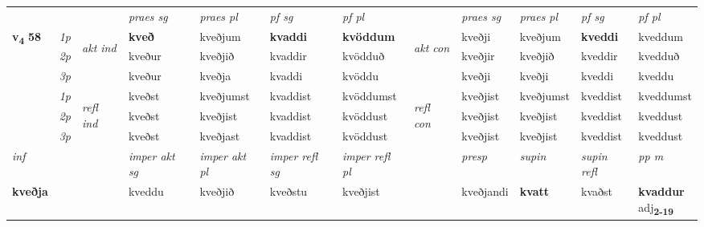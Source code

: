 \begin{longtable}[l]{X>{\footnotesize\itshape}llXXXXlXXXX}
\midrule

 & &   & \textit{praes sg}  & \textit{praes pl}    & \textit{ pf sg} & \textit{pf pl} & & \textit{praes sg}  & \textit{praes pl}    & \textit{pf sg} & \textit{pf pl }  \\ \cmidrule{4-7} \cmidrule{9-12}
 \multirow{2}{*}{{{\textbf{v{\textsubscript{4}}} \Large{\textbf{58}}}}}  & 1p & \multirow{3}{*}{\begin{turn}{90}\textit{akt ind}\end{turn}} & \textbf{kveð} & kveðjum & \textbf{kvaddi} & \textbf{kvöddum} & \multirow{3}{*}{\begin{turn}{90}\textit{akt con}\end{turn}} &kveðji & kveðjum & \textbf{kveddi} & kveddum\\*
 & 2p &  &  kveður  & kveðjið & kvaddir & kvödduð & & kveðjir & kveðjið & kveddir & kvedduð \\*
 & 3p &  & kveður & kveðja & kvaddi & kvöddu & & kveðji & kveðji& kveddi & kveddu \\*
\cmidrule{4-7} \cmidrule{9-12}
 & 1p & \multirow{3}{*}{\begin{turn}{90}\textit{refl ind}\end{turn}}  & kveðst & kveðjumst & kvaddist & kvöddumst & \multirow{3}{*}{\begin{turn}{90}\textit{refl con}\end{turn}}  &kveðjist & kveðjumst & kveddist & kveddumst \\*
 & 2p &  & kveðst & kveðjist & kvaddist & kvöddust & &kveðjist & kveðjist & kveddist & kveddust \\*
 & 3p  & & kveðst & kveðjast & kvaddist & kvöddust & & kveðjist & kveðjist& kveddist & kveddust \\*
\cmidrule{4-7} \cmidrule{9-12}

   {\textit{inf}} & &  & \textit{imper akt sg} & \textit{imper akt pl} & \textit{imper refl sg} & \textit{imper refl pl} && \textit{presp} & \textit{supin} & \textit{supin refl} & \textit{pp m} \\*
  {\textbf{kveðja}} & && kveddu  & kveðjið & kveðstu & kveðjist && kveðjandi &  \textbf{kvatt} & kvaðst & \specialcell{\textbf{kvaddur} \\ adj\textbf{\textsubscript{2-19}}} \\*

\midrule


\end{longtable}
